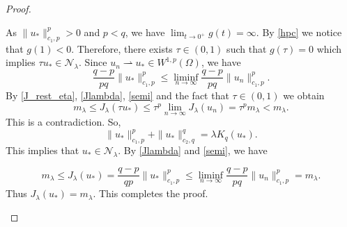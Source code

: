 \documentclass[10pt,a4paper]{amsart}
\begin{document}
\begin{proof}
\begin{itemize}
As $\|u_*\|_{c_1,p}^p>0$ and $p<q$, we have $\lim_{t \rightarrow 0^{+}}g(t)=\infty$.  By \eqref{hpc} we notice that $g(1)<0$. Therefore, there exists $\tau \in(0,1)$ such that $g(\tau)=0$ which implies $\tau u_{*} \in \mathcal{N}_{\lambda}$.
Since $u_{n} \rightharpoonup u_{*} \in W^{1,p}(\Omega)$, we have 
\begin{equation}\label{semi}
    \frac{q-p}{pq}\|u_*\|_{c_1,p}^p \leqslant \liminf_{n\to \infty} \frac{q-p}{pq}\|u_n\|_{c_1,p}^p .
\end{equation}
By \eqref{J_rest_eta}, \eqref{Jlambda}, \eqref{semi} and the fact that $\tau\in (0,1)$ we obtain
$$
m_{\lambda} \leqslant J_{\lambda}\left(\tau u_{*}\right)
\leqslant \tau^{p} \lim _{n \rightarrow \infty} J_{\lambda}\left(u_{n}\right)=\tau^{p} m_{\lambda}<m_{\lambda}.
$$
This is a contradiction. So, 
\begin{equation*}\label{deskp}
\|u_*\|_{c_1,p}^p+\|u_* \|_{c_2,q}^q=\lambda K_q(u_{*}).
\end{equation*}
This implies that  $u_{*}\in \mathcal{N}_{\lambda}$.  By \eqref{Jlambda} and \eqref{semi}, we have

$$m_{\lambda} \leqslant J_{\lambda}\left(u_{*}\right)= \frac{q-p}{q p} \|u_*\|_{c_1,p}^p \leqslant \liminf_{n\to \infty} \frac{q-p}{pq}\|u_n\|_{c_1,p}^p = m_{\lambda}.
$$
Thus $J_{\lambda}\left(u_{*}\right)=m_{\lambda}$. This completes the proof.
\end{itemize}
\end{proof}
\end{document}
